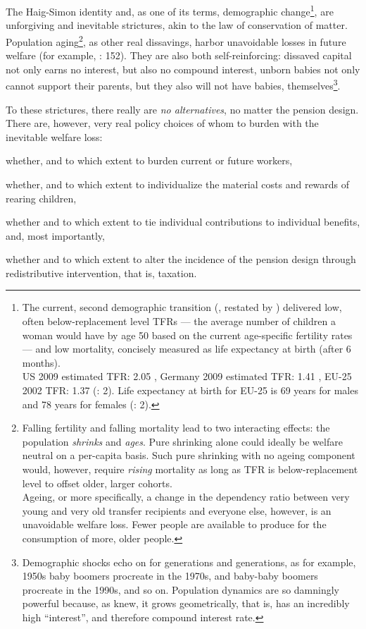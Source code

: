 The Haig-Simon identity and, as one of its terms, demographic change\footnote{
	The current, second demographic transition (\citealt{Davis1945}, restated by \citealt{Caldwell-1976-aa}) delivered low, often below-replacement level \glspl{TFR} --- the average number of children a woman would have by age 50 based on the current age-specific fertility rates --- and low mortality, concisely measured as life expectancy at birth (after 6 months). \\
	US 2009 estimated TFR: 2.05 \citep{CIA2009}, Germany 2009 estimated TFR: 1.41 \citep{CIA2009}, EU-25 2002 TFR: 1.37 (\citealt{Demeny-2003-aa}: 2). Life expectancy at birth for EU-25 is 69 years for males and 78 years for females (\citealt{Demeny-2003-aa}: 2).},
are unforgiving and inevitable strictures, akin to the law of conservation of matter. Population aging\footnote{
	Falling fertility and falling mortality lead to two interacting effects: the population \emph{shrinks} and \emph{ages}. Pure shrinking alone could ideally be welfare neutral on a per-capita basis. Such pure shrinking with no ageing component would, however, require \emph{rising} mortality as long as TFR is below-replacement level to offset older, larger cohorts.\\
	Ageing, or more specifically, a change in the dependency ratio between very young and very old transfer recipients and everyone else, however, is an unavoidable welfare loss. Fewer people are available to produce for the consumption of more, older people.},
as other real dissavings, harbor unavoidable losses in future welfare (for example, \citealt{Borsch-Supan2003}: 152). They are also both self-reinforcing: dissaved capital not only earns no interest, but also no compound interest, unborn babies not only cannot support their parents, but they also will not have babies, themselves\footnote{
	Demographic shocks echo on for generations and generations, as for example, 1950s baby boomers procreate in the 1970s, and baby-baby boomers procreate in the 1990s, and so on. Population dynamics are so damningly powerful because, as \cite{Malthus1798} knew, it grows geometrically, that is, has an incredibly high ``interest'', and therefore compound interest rate.}.

To these strictures, there really are \emph{no alternatives}, no matter the pension design. There are, however, very real policy choices of whom to burden with the inevitable welfare loss: \begin{inparaenum} \item whether, and to which extent to burden current or future workers, \item whether, and to which extent to individualize the material costs and rewards of rearing children, \item whether and to which extent to tie individual contributions to individual benefits, and, most importantly, \item whether and to which extent to alter the incidence of the pension design through redistributive intervention, that is, taxation. \end{inparaenum}

